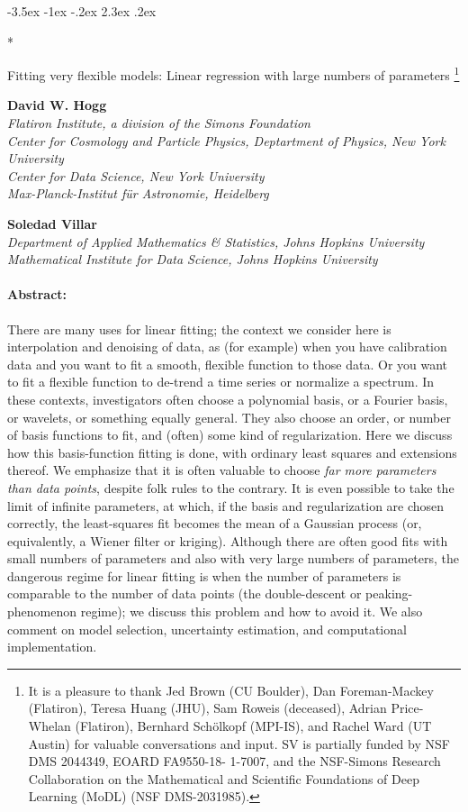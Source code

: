 \documentclass[12pt,letterpaper]{article}
\makeatletter
\renewcommand\section{\@startsection {section}{1}{\z@}%
  {-3.5ex \@plus -1ex \@minus -.2ex}%
  {2.3ex \@plus.2ex}%
  {\raggedright\normalfont\Large\bfseries}}
\makeatother
\begin{document}
\thispagestyle{plain}

\section*{\raggedright Fitting very flexible models: Linear regression with large numbers of parameters%
\footnote{%
It is a pleasure to thank
Jed Brown (CU Boulder),
Dan Foreman-Mackey (Flatiron),
Teresa Huang (JHU),
Sam Roweis (deceased),
Adrian Price-Whelan (Flatiron),
Bernhard Sch\"olkopf (MPI-IS), and
Rachel Ward (UT Austin)
for valuable conversations and input.
SV is partially funded by NSF DMS 2044349, EOARD FA9550-18-
1-7007, and the NSF-Simons Research Collaboration on the Mathematical and Scientific
Foundations of Deep Learning (MoDL) (NSF DMS-2031985).}}

\noindent
\textbf{David W. Hogg} \\
\textsl{\footnotesize Flatiron Institute, a division of the Simons Foundation \\
Center for Cosmology and Particle Physics, Deptartment of Physics, New York University \\
Center for Data Science, New York University \\
Max-Planck-Institut f\"ur Astronomie, Heidelberg}

\medskip
\noindent
\textbf{Soledad Villar} \\
\textsl{\footnotesize Department of Applied Mathematics \& Statistics, Johns Hopkins University \\
Mathematical Institute for Data Science, Johns Hopkins University}

\paragraph{Abstract:} There are many uses for linear fitting; the context we consider here is interpolation and denoising of data, as (for example) when you have calibration data and you want to fit a smooth, flexible function to those data.
Or you want to fit a flexible function to de-trend a time series or normalize a spectrum.
In these contexts, investigators often choose a polynomial basis, or a Fourier basis, or wavelets, or something equally general.
They also choose an order, or number of basis functions to fit, and (often) some kind of regularization.
Here we discuss how this basis-function fitting is done, with ordinary least squares and extensions thereof.
We emphasize that it is often valuable to choose \emph{far more parameters than data points}, despite folk rules to the contrary.
It is even possible to take the limit of infinite parameters, at which, if the basis and regularization are chosen correctly, the least-squares fit becomes the mean of a Gaussian process (or, equivalently, a Wiener filter or kriging).
Although there are often good fits with small numbers of parameters and also with very large numbers of parameters, the dangerous regime for linear fitting is when the number of parameters is comparable to the number of data points (the double-descent or peaking-phenomenon regime); we discuss this problem and how to avoid it.
We also comment on model selection, uncertainty estimation, and computational implementation.
\end{document}
